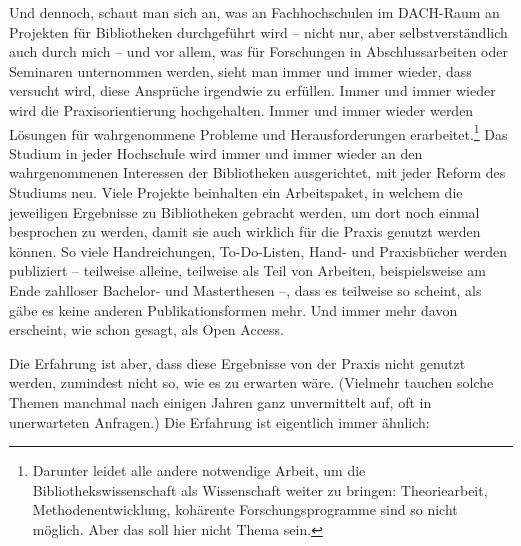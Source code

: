 \documentclass[a4paper,
fontsize=11pt,
oneside,
numbers=noperiodatend,
parskip=half-,
bibliography=totoc,
final
]{scrartcl}
\begin{document}
Und dennoch, schaut man sich an, was an Fachhochschulen im DACH-Raum an
Projekten für Bibliotheken durchgeführt wird -- nicht nur, aber
selbstverständlich auch durch mich -- und vor allem, was für Forschungen
in Abschlussarbeiten oder Seminaren unternommen werden, sieht man immer
und immer wieder, dass versucht wird, diese Ansprüche irgendwie zu
erfüllen. Immer und immer wieder wird die Praxisorientierung
hochgehalten. Immer und immer wieder werden Lösungen für wahrgenommene
Probleme und Herausforderungen erarbeitet.\footnote{Darunter leidet alle
  andere notwendige Arbeit, um die Bibliothekswissenschaft als
  Wissenschaft weiter zu bringen: Theoriearbeit, Methodenentwicklung,
  kohärente Forschungsprogramme sind so nicht möglich. Aber das soll
  hier nicht Thema sein.} Das Studium in jeder Hochschule wird immer und
immer wieder an den wahrgenommenen Interessen der Bibliotheken
ausgerichtet, mit jeder Reform des Studiums neu. Viele Projekte
beinhalten ein Arbeitspaket, in welchem die jeweiligen Ergebnisse zu
Bibliotheken gebracht werden, um dort noch einmal besprochen zu werden,
damit sie auch wirklich für die Praxis genutzt werden können. So viele
Handreichungen, To-Do-Listen, Hand- und Praxisbücher werden publiziert
-- teilweise alleine, teilweise als Teil von Arbeiten, beispielsweise am
Ende zahlloser Bachelor- und Masterthesen --, dass es teilweise so
scheint, als gäbe es keine anderen Publikationsformen mehr. Und immer
mehr davon erscheint, wie schon gesagt, als Open Access.

Die Erfahrung ist aber, dass diese Ergebnisse von der Praxis nicht
genutzt werden, zumindest nicht so, wie es zu erwarten wäre. (Vielmehr
tauchen solche Themen manchmal nach einigen Jahren ganz unvermittelt
auf, oft in unerwarteten Anfragen.) Die Erfahrung ist eigentlich immer
ähnlich:
\end{document}
